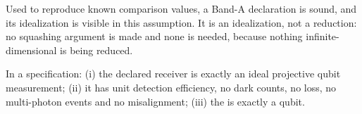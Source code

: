 
Used to reproduce known comparison values, a Band-A declaration is sound,
and its idealization is visible in this assumption. It is an idealization,
not a reduction: no squashing argument is made and none is needed, because
nothing infinite-dimensional is being reduced.

\begin{assumption}\label{ass:ideal}
In a  specification:
(i) the declared receiver is exactly an ideal projective qubit measurement;
(ii) it has unit detection efficiency, no dark counts, no loss, no
multi-photon events and no misalignment;
(iii) the  is exactly a qubit.
\end{assumption}

